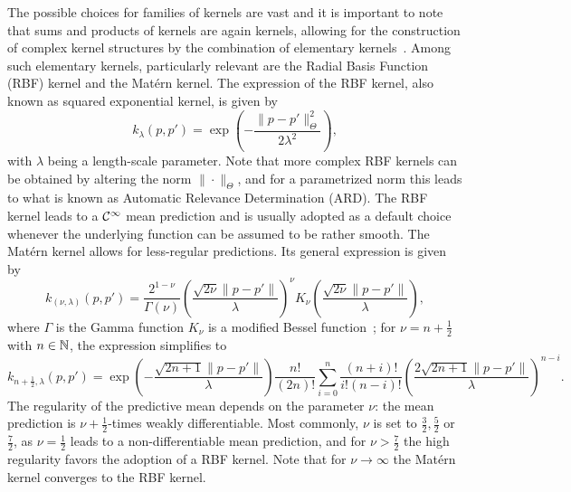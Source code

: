 The possible choices for families of kernels are vast and it is important to note that sums and products of kernels are again kernels, allowing for the construction of complex kernel structures by the combination of elementary kernels~\cite{Duvenaud}.
Among such elementary kernels, particularly relevant are the Radial Basis Function (RBF) kernel and the Matérn kernel. \newline
The expression of the RBF kernel, also known as squared exponential kernel, is given by
\[
k_{\lambda}(p, p') = \exp\left(-\frac{\|p - p'\|_\Theta^2}{2\lambda^2}\right),
\]
with $\lambda$ being a length-scale parameter. 
Note that more complex RBF kernels can be obtained by altering the norm $\| \cdot \|_\Theta$, and for a parametrized norm this leads to what is known as Automatic Relevance Determination (ARD).
The RBF kernel leads to a $\mathcal C^\infty$ mean prediction and is usually adopted as a default choice whenever the underlying function can be assumed to be rather smooth. \newline
The Matérn kernel allows for less-regular predictions. Its general expression is given by
\[
k_{(\nu, \lambda)}(p, p') = \frac{2^{1-\nu}}{\Gamma(\nu)} \left( \frac{\sqrt{2\nu} \|p - p'\|}{\lambda} \right)^\nu K_\nu \left( \frac{\sqrt{2\nu} \|p - p'\|}{\lambda} \right),
\]
where $\Gamma$ is the Gamma function $K_\nu$ is a modified Bessel function~\cite[sec. 9.6]{AbramowitzStegun1964};
for $\nu = n + \frac{1}{2}$ with $n\in \mathbb N$, the expression simplifies to 
\[
     k_{n+\frac{1}{2}, \lambda}(p, p')=\exp \left(-{\frac {{\sqrt {2n+1}}\|p - p'\|}{\lambda }}\right){\frac {n!}{(2n)!}}\sum _{i=0}^{n}{\frac {(n+i)!}{i!(n-i)!}}\left({\frac {2{\sqrt {2n+1}}\|p - p'\|}{\lambda }}\right)^{n-i}.
\]
The regularity of the predictive mean depends on the parameter $\nu$: the mean prediction is $\nu + \frac{1}{2}$-times weakly differentiable.
Most commonly, $\nu$ is set to $\frac{3}{2}, \frac{5}{2}$ or $\frac{7}{2}$, as $\nu = \frac{1}{2}$ leads to a non-differentiable mean prediction, and for $\nu > \frac{7}{2}$ the high regularity favors the adoption of a RBF kernel.
Note that for $\nu \rightarrow \infty$ the Matérn kernel converges to the RBF kernel. \newline

